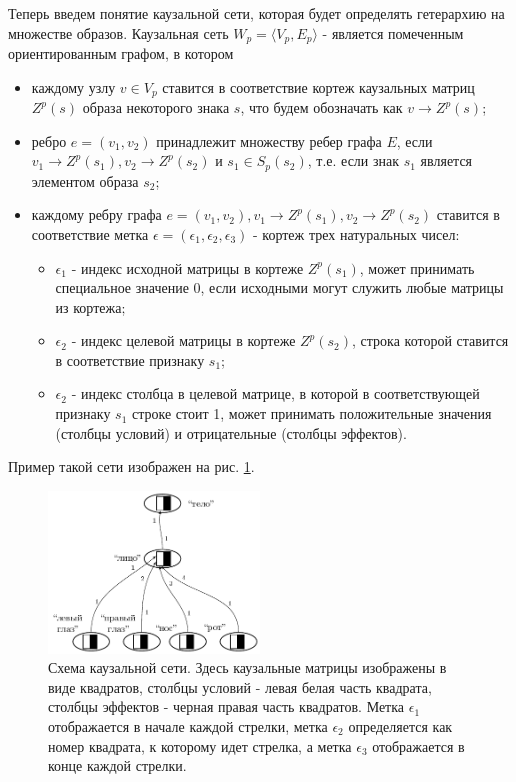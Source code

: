 \documentclass[12pt]{scrartcl}
\begin{document}
	Теперь введем понятие каузальной сети, которая будет определять гетерархию на множестве образов. Каузальная сеть $W_p=\langle V_p, E_p \rangle$ - является помеченным ориентированным графом, в котором
	\begin{itemize}
		\item каждому узлу $v\in V_p$ ставится в соответствие кортеж каузальных матриц $Z^p(s)$ образа некоторого знака $s$, что будем обозначать как $v\rightarrow Z^p(s)$;
		\item ребро $e=(v_1, v_2)$ принадлежит множеству ребер графа $E$, если $v_1\rightarrow Z^p(s_1), v_2\rightarrow Z^p(s_2)$ и $s_1\in S_p(s_2)$, т.е. если знак $s_1$ является элементом образа $s_2$;
		\item каждому ребру графа $e=(v_1, v_2), v_1\rightarrow Z^p(s_1), v_2\rightarrow Z^p(s_2)$ ставится в соответствие метка $\epsilon=(\epsilon_1,\epsilon_2,\epsilon_3)$ - кортеж трех натуральных чисел:
		\begin{itemize}
			\item $\epsilon_1$ - индекс исходной матрицы в кортеже $Z^p(s_1)$, может принимать специальное значение 0, если исходными могут служить любые матрицы из кортежа;
			\item $\epsilon_2$ - индекс целевой матрицы в кортеже $Z^p(s_2)$, строка которой ставится в соответствие признаку $s_1$;
			\item $\epsilon_2$ - индекс столбца в целевой матрице, в которой в соответствующей признаку $s_1$ строке стоит 1, может принимать положительные значения (столбцы условий) и отрицательные (столбцы эффектов).
		\end{itemize}		
	\end{itemize}
	
	Пример такой сети изображен на рис. \ref{fig:caus_net}.

	\begin{figure}[h]
		\centering
		\includegraphics[width=0.5\textwidth,page=1]{examples/causnet/caus_net}
		\caption{Схема каузальной сети. Здесь каузальные матрицы изображены в виде квадратов, столбцы условий - левая белая часть квадрата, столбцы эффектов - черная правая часть квадратов. Метка $\epsilon_1$ отображается в начале каждой стрелки, метка $\epsilon_2$ определяется как номер квадрата, к которому идет стрелка, а метка $\epsilon_3$ отображается в конце каждой стрелки.}
		\label{fig:caus_net}		
	\end{figure}
		
\end{document}
